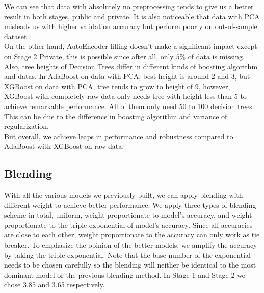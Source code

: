 \documentclass[10pt,a4paper]{article}
\begin{document}
We can see that data with absolutely no preprocessing tends to give us a better result in both stages, public and private. It is also noticeable that data with PCA misleads us with higher validation accuracy but perform poorly on out-of-sample dataset. \\
On the other hand, AutoEncoder filling doesn't make a significant impact except on Stage 2 Private, this is possible since after all, only $5\%$ of data is missing.\\
Also, tree heights of Decision Trees differ in different kinds of boosting algorithm and datas. In AdaBoost on data with PCA, best height is around 2 and 3, but XGBoost on data with PCA, tree tends to grow to height of 9, however, XGBoost with completely raw data only needs tree with height less than 5 to achieve remarkable performance. All of them only need 50 to 100 decision trees. This can be due to the difference in boosting algorithm and variance of regularization.\\
But overall, we achieve leaps in performance and robustness compared to AdaBoost with XGBoost on raw data.



\subsection{Blending}
With all the various models we previously built, we can apply blending with different weight to achieve better performance. 
We apply three types of blending scheme in total, uniform, weight proportionate to model's accuracy, and weight proportionate to the triple exponential of model's accuracy. 
Since all accuracies are close to each other, weight proportionate to the accuracy can only work as tie breaker. To emphasize the opinion of the better models, we amplify the accuracy by taking the triple exponential. 
Note that the base number of the exponential needs to be chosen carefully so the blending will neither be identical to the most dominant model or the previous blending method. In Stage 1 and Stage 2 we chose 3.85 and 3.65 respectively.
\end{document}
